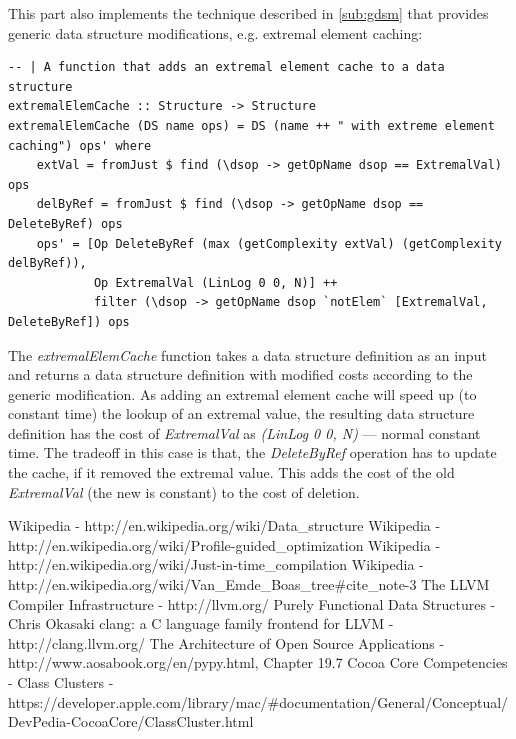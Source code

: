 \documentclass[a4paper,11pt]{article}
\begin{document}
\begin{appendices}
		This part also implements the technique described in \autoref{sub:gdsm} that provides generic 
		data structure modifications, e.g. extremal element caching:
\begin{verbatim}
-- | A function that adds an extremal element cache to a data structure
extremalElemCache :: Structure -> Structure
extremalElemCache (DS name ops) = DS (name ++ " with extreme element caching") ops' where
    extVal = fromJust $ find (\dsop -> getOpName dsop == ExtremalVal) ops
    delByRef = fromJust $ find (\dsop -> getOpName dsop == DeleteByRef) ops
    ops' = [Op DeleteByRef (max (getComplexity extVal) (getComplexity delByRef)),
            Op ExtremalVal (LinLog 0 0, N)] ++
            filter (\dsop -> getOpName dsop `notElem` [ExtremalVal, DeleteByRef]) ops
\end{verbatim}
	The \emph{extremalElemCache} function takes a data structure definition as an input and 
	returns a data structure definition with modified costs according to the generic modification.
	As adding an extremal element cache will speed up (to constant time) the lookup of an 
	extremal value, the resulting data structure definition has the cost of \emph{ExtremalVal}
	as \emph{(LinLog 0 0, N)} --- normal constant time. The tradeoff in this case is that, 
	the \emph{DeleteByRef} operation has to update the cache, if it removed the extremal value.
	This adds the cost of the old \emph{ExtremalVal} (the new is constant) to the cost of 
	deletion.
		
		
\end{appendices}

\newpage
\begin{thebibliography}{9}
	 Wikipedia - http://en.wikipedia.org/wiki/Data\_structure
     Wikipedia - http://en.wikipedia.org/wiki/Profile-guided\_optimization
     Wikipedia - http://en.wikipedia.org/wiki/Just-in-time\_compilation
     Wikipedia - http://en.wikipedia.org/wiki/Van\_Emde\_Boas\_tree\#cite\_note-3
	 The LLVM Compiler Infrastructure - http://llvm.org/
	 Purely Functional Data Structures - Chris Okasaki
	 clang: a C language family frontend for LLVM - http://clang.llvm.org/
	 The Architecture of Open Source Applications - http://www.aosabook.org/en/pypy.html, Chapter 19.7
	 Cocoa Core Competencies - Class Clusters - \\
		https://developer.apple.com/library/mac/\#documentation/General/Conceptual/DevPedia-CocoaCore/ClassCluster.html
\end{thebibliography}
\end{document}
